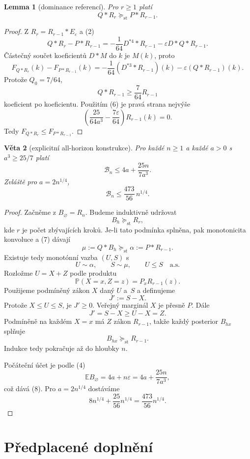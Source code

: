 \documentclass[11pt,a4paper]{article}
\newtheorem{theorem}{Věta}
\newtheorem{lemma}[theorem]{Lemma}
\theoremstyle{definition}
\theoremstyle{remark}
\theoremstyle{plain}
\newcommand{\E}{\mathbb E}
\newcommand{\Prb}{\mathbb P}
\newcommand{\st}{\mathrm{st}}
\begin{document}
\begin{lemma}[dominance referencí]
Pro $r\ge1$ platí
\[
Q*R_r\succeq_{\st}P*R_{r-1}.
\tag{7}
\]
\end{lemma}

\begin{proof}
Z $R_r=R_{r-1}*E_\varepsilon$ a (2)
\[
Q*R_r-P*R_{r-1}
=
-\frac1{64}D^{*4}*R_{r-1}
-\varepsilon D*Q*R_{r-1}.
\]
Částečný součet koeficientů $D*M$ do $k$ je $M(k)$, proto
\[
F_{Q*R_r}(k)-F_{P*R_{r-1}}(k)
=
-\frac1{64}(D^{*3}*R_{r-1})(k)
-\varepsilon(Q*R_{r-1})(k).
\]
Protože $Q_0=7/64$,
\[
Q*R_{r-1}\ge\frac7{64}R_{r-1}
\]
koeficient po koeficientu. Použitím (6) je pravá strana nejvýše
\[
\left(
\frac{25}{64a^3}-\frac{7\varepsilon}{64}
\right)R_{r-1}(k)=0.
\]
Tedy $F_{Q*R_r}\le F_{P*R_{r-1}}$.
\end{proof}

\begin{theorem}[explicitní all-horizon konstrukce]
Pro každé $n\ge1$ a každé $a>0$ s $a^3\ge25/7$ platí
\[
\boxed{
\mathcal B_n\le 4a+\frac{25n}{7a^3}.
}
\tag{8}
\]
Zvláště pro $a=2n^{1/4}$,
\[
\boxed{
\mathcal B_n\le\frac{473}{56}\,n^{1/4}.
}
\tag{9}
\]
\end{theorem}

\begin{proof}
Začněme z $B_\varnothing=R_n$. Budeme induktivně udržovat
\[
B_h\succeq_{\st}R_r,
\]
kde $r$ je počet zbývajících kroků. Je-li tato podmínka splněna,
pak monotonicita konvoluce a (7) dávají
\[
\mu:=Q*B_h\succeq_{\st}\alpha:=P*R_{r-1}.
\]
Existuje tedy monotónní vazba $(U,S)$ s
\[
U\sim\alpha,\qquad S\sim\mu,\qquad U\le S\quad\text{a.s.}
\]
Rozložme $U=X+Z$ podle produktu
\[
\Prb(X=x,Z=z)=P_xR_{r-1}(z).
\]
Použijeme podmíněný zákon $X$ daný $U$ a~$S$ a definujeme
\[
J':=S-X.
\]
Protože $X\le U\le S$, je $J'\ge0$. Veřejný marginál $X$ je přesně
$P$. Dále
\[
J'=S-X\ge U-X=Z.
\]
Podmíněně na každém $X=x$ má $Z$ zákon $R_{r-1}$, takže každý
posterior $B_{hx}$ splňuje
\[
B_{hx}\succeq_{\st}R_{r-1}.
\]
Indukce tedy pokračuje až do hloubky $n$.

Počáteční účet je podle (4)
\[
\E B_\varnothing
=
4a+n\varepsilon
=
4a+\frac{25n}{7a^3},
\]
což dává (8). Pro $a=2n^{1/4}$ dostáváme
\[
8n^{1/4}+\frac{25}{56}n^{1/4}
=
\frac{473}{56}n^{1/4}.
\]
\end{proof}

\section{Předplacené doplnění}
\end{document}
